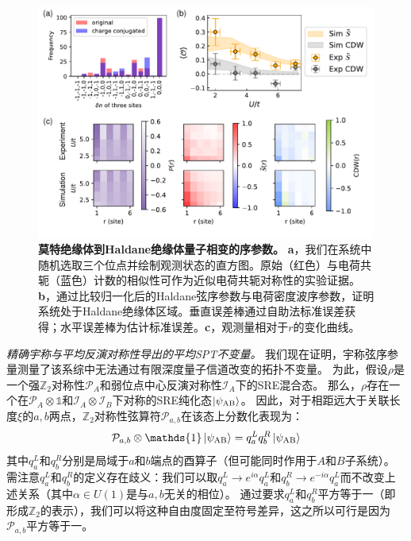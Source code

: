 \documentclass[preprint,superscriptaddress,floatfix, nofootinbib]{revtex4-2}
\begin{document}
\begin{figure}
    \centering
    \includegraphics[width=\textwidth]{figures/HI_2D_OP.pdf}
    \caption{\textbf{莫特绝缘体到Haldane绝缘体量子相变的序参数。} \textbf{a}，我们在系统中随机选取三个位点并绘制观测状态的直方图。原始（红色）与电荷共轭（蓝色）计数的相似性可作为近似电荷共轭对称性的实验证据。\textbf{b}，通过比较归一化后的Haldane弦序参数与电荷密度波序参数，证明系统处于Haldane绝缘体区域。垂直误差棒通过自助法标准误差获得；水平误差棒为估计标准误差。\textbf{c}，观测量相对于$r$的变化曲线。
    }
    \label{fig: HI_2D_OP}
\end{figure}
\textit{精确宇称与平均反演对称性导出的平均SPT不变量。} 我们现在证明，宇称弦序参量测量了该系综中无法通过有限深度量子信道改变的拓扑不变量。
为此，假设$\rho$是一个强$\mathbb{Z}_2$对称性$\mathcal{P}_A$和弱位点中心反演对称性$\mathcal{I}_A$下的SRE混合态。
那么，$\rho$存在一个在$\mathcal{P}_A \otimes \mathds{1}$和$\mathcal{I}_A \otimes \mathcal{I}_B$下对称的SRE纯化态$\ket{\psi_{\text{AB}}}$。
因此，对于相距远大于关联长度$\xi$的$a, b$两点，$\mathbb{Z}_2$对称性弦算符$\mathcal{P}_{a, b}$在该态上分数化表现为：
\begin{equation}
    \mathcal{P}_{a, b} \otimes \mathds{1} \ket{\psi_{\text{AB}}} = q^L_a q^R_b \ket{\psi_{\text{AB}}}
\end{equation}
其中$q^L_a$和$q^R_b$分别是局域于$a$和$b$端点的酉算子（但可能同时作用于$A$和$B$子系统）。
需注意$q^L_a$和$q^R_b$的定义存在歧义：我们可以取$q_{a}^L \to e^{i \alpha} q_a^{L}$和$q_{b}^{R} \to e^{-i \alpha} q_a^{L}$而不改变上述关系（其中$\alpha \in U(1)$是与$a, b$无关的相位）。
通过要求$q_a^L$和$q_b^R$平方等于一（即形成$\mathbb{Z}_2$的表示），我们可以将这种自由度固定至符号差异，这之所以可行是因为$\mathcal{P}_{a, b}$平方等于一。
\end{document}
